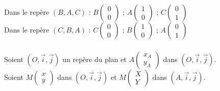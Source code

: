 \documentclass[12pt,a4paper]{article}
\begin{document}
\begin{center}
\end{center}

\noindent Dans le repère $(B, A, C)$ : $B \begin{pmatrix} 0 \\ 0 \end{pmatrix}$ ; $A \begin{pmatrix} 1 \\ 0 \end{pmatrix}$ ; $C \begin{pmatrix} 0 \\ 1 \end{pmatrix}$ \\
\noindent Dans le repère $(C, B, A)$ : $C \begin{pmatrix} 0 \\ 0 \end{pmatrix}$ ; $B \begin{pmatrix} 1 \\ 0 \end{pmatrix}$ ; $A \begin{pmatrix} 0 \\ 1 \end{pmatrix}$

\subsubsection*{\centering \underline{\color{red}{c) Changement de repère par translation}}}

Soient {\color{red}$(O, \vec{i}, \vec{j})$} un repère du plan et {\color{red}$A \begin{pmatrix} x_A \\ y_A \end{pmatrix}$} dans {\color{red}$(O, \vec{i}, \vec{j})$}. \\
Soient {\color{red}$M \begin{pmatrix} x \\ y \end{pmatrix}$} dans {\color{red}$(O, \vec{i}, \vec{j})$} et {\color{red}$M \begin{pmatrix} X \\ Y \end{pmatrix}$} dans {\color{red}$(A, \vec{i}, \vec{j})$}.
\end{document}
